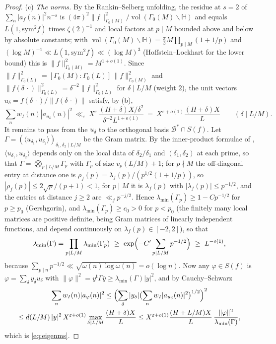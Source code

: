 \documentclass[11pt]{amsart}
\theoremstyle{remark}
\newcommand{\HH}{\mathbb{H}}
\newcommand{\cB}{\mathcal{B}}
\newcommand{\e}{\varepsilon}
\DeclareMathOperator{\vol}{vol}
\begin{document}
\begin{proof}
(c) \emph{The norms.} By the Rankin--Selberg unfolding, the residue at $s=2$ of $\sum_n|a_f(n)|^2n^{-s}$ is $(4\pi)^2\|f\|^2_{\Gamma_0(M)}/\vol(\Gamma_0(M)\backslash\HH)$ and equals $L(1,\mathrm{sym}^2f)$ times $\zeta(2)^{-1}$ and local factors at $p\mid M$ bounded above and below by absolute constants; with $\vol(\Gamma_0(M)\backslash\HH)=\frac\pi3M\prod_{p\mid M}(1+1/p)$ and $(\log M)^{-1}\ll L(1,\mathrm{sym}^2f)\ll(\log M)^3$ (Hoffstein--Lockhart \cite{HL} for the lower bound) this is $\|f\|^2_{\Gamma_0(M)}=M^{1+o(1)}$. Since $\|f\|^2_{\Gamma_0(L)}=[\Gamma_0(M):\Gamma_0(L)]\,\|f\|^2_{\Gamma_0(M)}$ and $\|f(\delta\,\cdot)\|^2_{\Gamma_0(L)}=\delta^{-2}\|f\|^2_{\Gamma_0(L)}$ for $\delta\mid L/M$ (weight $2$), the unit vectors $u_\delta=f(\delta\,\cdot)/\|f(\delta\,\cdot)\|$ satisfy, by (b),
\[
\sum_nw_I(n)|a_{u_\delta}(n)|^2\ \ll_\e\ X^{\e}\,\frac{(H+\delta)X/\delta^2}{\delta^{-2}L^{1+o(1)}}\ =\ X^{\e+o(1)}\frac{(H+\delta)X}{L}\qquad(\delta\mid L/M).
\]
It remains to pass from the $u_\delta$ to the orthogonal basis $\cB^*\cap S(f)$. Let $\Gamma=(\langle u_{\delta_1},u_{\delta_2}\rangle)_{\delta_1,\delta_2\mid L/M}$ be the Gram matrix. By the inner-product formulae of \cite[Section~2]{ILS}, $\langle u_{\delta_1},u_{\delta_2}\rangle$ depends only on the local data of $\delta_2/\delta_1$ and $(\delta_1,\delta_2)$ at each prime, so that $\Gamma=\bigotimes_{p\mid L/M}\Gamma_p$ with $\Gamma_p$ of size $v_p(L/M)+1$; for $p\nmid M$ the off-diagonal entry at distance one is $\rho_f(p)=\lambda_f(p)/(p^{1/2}(1+1/p))$, so $|\rho_f(p)|\le2\sqrt p/(p+1)<1$, for $p\mid M$ it is $\lambda_f(p)$ with $|\lambda_f(p)|\le p^{-1/2}$, and the entries at distance $j\ge2$ are $\ll_j p^{-j/2}$. Hence $\lambda_{\min}(\Gamma_p)\ge1-Cp^{-1/2}$ for $p\ge p_0$ (Gershgorin), and $\lambda_{\min}(\Gamma_p)\ge c_0>0$ for $p<p_0$ (the finitely many local matrices are positive definite, being Gram matrices of linearly independent functions, and depend continuously on $\lambda_f(p)\in[-2,2]$), so that
\[
\lambda_{\min}(\Gamma)=\prod_{p\mid L/M}\lambda_{\min}(\Gamma_p)\ \ge\ \exp\Bigl(-C'\sum_{p\mid L/M}p^{-1/2}\Bigr)\ \ge\ L^{-o(1)},
\]
because $\sum_{p\mid n}p^{-1/2}\ll\sqrt{\omega(n)\log\omega(n)}=o(\log n)$. Now any $\varphi\in S(f)$ is $\varphi=\sum_\delta y_\delta u_\delta$ with $\|\varphi\|^2=y^{\mathrm t}\Gamma\bar y\ge\lambda_{\min}(\Gamma)|y|^2$, and by Cauchy--Schwarz
\begin{multline*}
\sum_nw_I(n)|a_\varphi(n)|^2\le\Bigl(\sum_\delta|y_\delta|\bigl(\sum_nw_I|a_{u_\delta}(n)|^2\bigr)^{1/2}\Bigr)^2\\
\le d(L/M)\,|y|^2\,X^{\e+o(1)}\max_{\delta\mid L/M}\frac{(H+\delta)X}{L}\le X^{\e+o(1)}\frac{(H+L/M)X}{L}\,\frac{\|\varphi\|^2}{\lambda_{\min}(\Gamma)},
\end{multline*}
which is \eqref{eq:eigenms}.
\end{proof}
\end{document}
